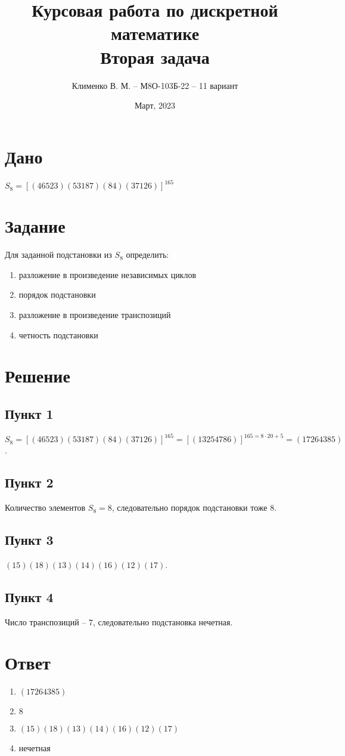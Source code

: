 \documentclass{article}
\title{Курсовая работа по дискретной математике\\Вторая задача}
\author{Клименко В. М. -- М8О-103Б-22 -- 11 вариант}
\date{Март, 2023}
\begin{document}
\maketitle


\section*{Дано}
$S_8 = [(46523)(53187)(84)(37126)]^{165}$ 

\section*{Задание}
Для заданной подстановки из $S_8$ определить:
\begin{enumerate}
    \item разложение в произведение независимых циклов
    \item порядок подстановки
    \item разложение в произведение транспозиций
    \item четность подстановки
\end{enumerate}


\section*{Решение}
\subsection*{Пункт 1}
$S_8 = [(46523)(53187)(84)(37126)]^{165} = [(13254786)]^{165=8 \cdot 20+5}
= (17264385)$.

\subsection*{Пункт 2}
Количество элементов $S_8 = 8$, следовательно порядок подстановки тоже $8$.

\subsection*{Пункт 3}
$(15)(18)(13)(14)(16)(12)(17)$.

\subsection*{Пункт 4}
Число транспозиций -- $7$, следовательно подстановка нечетная.


\section*{Ответ}
\begin{enumerate}
    \item $(17264385)$
    \item $8$
    \item $(15)(18)(13)(14)(16)(12)(17)$
    \item нечетная
\end{enumerate}
\end{document}

